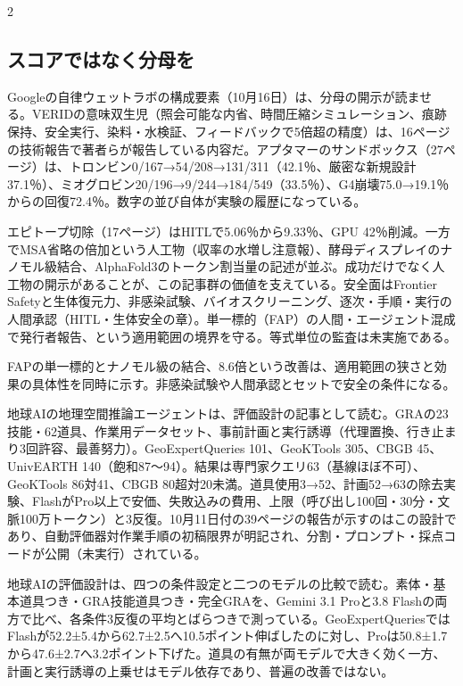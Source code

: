 \documentclass[lualatex,a4paper,10pt]{jlreq}
\begin{document}
\begin{multicols}{2}
\subsection*{スコアではなく分母を}

Googleの自律ウェットラボの構成要素（10月16日）は、分母の開示が読ませる。VERIDの意味双生児（照会可能な内省、時間圧縮シミュレーション、痕跡保持、安全実行、染料・水検証、フィードバックで5倍超の精度）は、16ページの技術報告で著者らが報告している内容だ。アプタマーのサンドボックス（27ページ）は、トロンビン0/167→54/208→131/311（42.1％、厳密な新規設計37.1％）、ミオグロビン20/196→9/244→184/549（33.5％）、G4崩壊75.0→19.1％からの回復72.4％。数字の並び自体が実験の履歴になっている。
\cite{B46,B83,B44,B43,B45}


エピトープ切除（17ページ）はHITLで5.06％から9.33％、GPU 42％削減。一方でMSA省略の倍加という人工物（収率の水増し注意報）、酵母ディスプレイのナノモル級結合、AlphaFold3のトークン割当量の記述が並ぶ。成功だけでなく人工物の開示があることが、この記事群の価値を支えている。安全面はFrontier Safetyと生体復元力、非感染試験、バイオスクリーニング、逐次・手順・実行の人間承認（HITL・生体安全の章）。単一標的（FAP）の人間・エージェント混成で発行者報告、という適用範囲の境界を守る。等式単位の監査は未実施である。
\cite{B46,B83,B44,B43,B45}


FAPの単一標的とナノモル級の結合、8.6倍という改善は、適用範囲の狭さと効果の具体性を同時に示す。非感染試験や人間承認とセットで安全の条件になる。
\cite{B46,B83,B44,B43,B45}


地球AIの地理空間推論エージェントは、評価設計の記事として読む。GRAの23技能・62道具、作業用データセット、事前計画と実行誘導（代理置換、行き止まり3回許容、最善努力）。GeoExpertQueries 101、GeoKTools 305、CBGB 45、UnivEARTH 140（飽和87〜94）。結果は専門家クエリ63（基線ほぼ不可）、GeoKTools 86対41、CBGB 80超対20未満。道具使用3→52、計画52→63の除去実験、FlashがPro以上で安価、失敗込みの費用、上限（呼び出し100回・30分・文脈100万トークン）と3反復。10月11日付の39ページの報告が示すのはこの設計であり、自動評価器対作業手順の初稿限界が明記され、分割・プロンプト・採点コードが公開（未実行）されている。
\cite{B47,B84,B48,B61}


地球AIの評価設計は、四つの条件設定と二つのモデルの比較で読む。素体・基本道具つき・GRA技能道具つき・完全GRAを、Gemini 3.1 Proと3.8 Flashの両方で比べ、各条件3反復の平均とばらつきで測っている。GeoExpertQueriesではFlashが52.2±5.4から62.7±2.5へ10.5ポイント伸ばしたのに対し、Proは50.8±1.7から47.6±2.7へ3.2ポイント下げた。道具の有無が両モデルで大きく効く一方、計画と実行誘導の上乗せはモデル依存であり、普遍の改善ではない。
\cite{B47,B84,B48}



\end{multicols}
\end{document}
